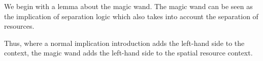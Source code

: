 \documentclass[thesis.tex]{subfiles}
\begin{document}
We begin with a lemma about the magic wand. The magic wand can be seen as the implication of separation logic which also takes into account the separation of resources.

\begin{minipage}{0.4\textwidth}
  \begin{prooftree}
  \end{prooftree}
\end{minipage}
%
\begin{minipage}{0.4\textwidth}
  \begin{prooftree}
  \end{prooftree}
\end{minipage}

Thus, where a normal implication introduction adds the left-hand side to the \coq context, the magic wand adds the left-hand side to the spatial resource context.
\end{document}
